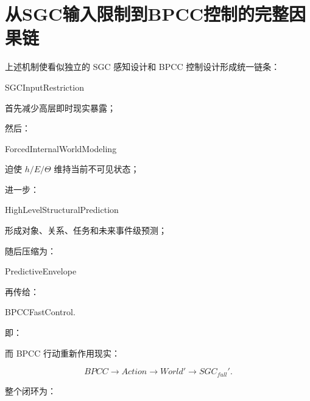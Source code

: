 \begin{statementbox}
\centering
{}
\end{statementbox}

\section{从SGC输入限制到BPCC控制的完整因果链}

上述机制使看似独立的 SGC 感知设计和 BPCC 控制设计形成统一链条：

\begin{statementbox}
SGCInputRestriction
\end{statementbox}

首先减少高层即时现实暴露；

然后：

\begin{statementbox}
ForcedInternalWorldModeling
\end{statementbox}

迫使 $h/E/\Theta$ 维持当前不可见状态；

进一步：

\begin{statementbox}
HighLevelStructuralPrediction
\end{statementbox}

形成对象、关系、任务和未来事件级预测；

随后压缩为：

\begin{statementbox}
PredictiveEnvelope
\end{statementbox}

再传给：

\begin{statementbox}
BPCCFastControl.
\end{statementbox}

即：

\begin{statementbox}
\centering
{}
\end{statementbox}

而 BPCC 行动重新作用现实：

\[
BPCC
\rightarrow
Action
\rightarrow
World'
\rightarrow
SGC_{full}'.
\]

整个闭环为：

